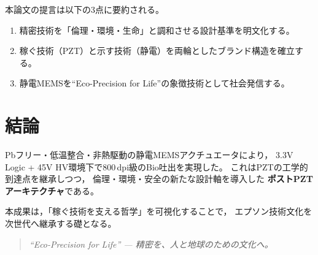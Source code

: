 \documentclass[conference]{IEEEtran}
\begin{document}
本論文の提言は以下の3点に要約される。
\begin{enumerate}[label=(\roman*)]
\item 精密技術を「倫理・環境・生命」と調和させる設計基準を明文化する。  
\item 稼ぐ技術（PZT）と示す技術（静電）を両輪としたブランド構造を確立する。  
\item 静電MEMSを“Eco-Precision for Life”の象徴技術として社会発信する。  
\end{enumerate}

\section{結論}
Pbフリー・低温整合・非熱駆動の静電MEMSアクチュエータにより，
3.3V Logic + 45V HV環境下で800\,dpi級のBio吐出を実現した。
これはPZTの工学的到達点を継承しつつ，
倫理・環境・安全の新たな設計軸を導入した
\textbf{ポストPZTアーキテクチャ}である。

本成果は，「稼ぐ技術を支える哲学」を可視化することで，
エプソン技術文化を次世代へ継承する礎となる。

\begin{quote}
\textit{“Eco-Precision for Life” —  
精密を、人と地球のための文化へ。}
\end{quote}

\balance
\end{document}
